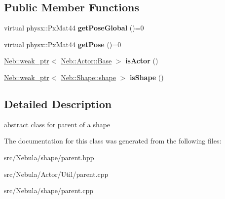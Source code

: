 \subsection*{\-Public \-Member \-Functions}
\begin{DoxyCompactItemize}
\item 
\hypertarget{classNeb_1_1Shape_1_1parent_a983131de9b12b32f30dd418b0779b509}{virtual physx\-::\-Px\-Mat44 {\bfseries get\-Pose\-Global} ()=0}\label{classNeb_1_1Shape_1_1parent_a983131de9b12b32f30dd418b0779b509}

\item 
\hypertarget{classNeb_1_1Shape_1_1parent_a38a4a71ad092ebd7c5b4e76ab20d2a1c}{virtual physx\-::\-Px\-Mat44 {\bfseries get\-Pose} ()=0}\label{classNeb_1_1Shape_1_1parent_a38a4a71ad092ebd7c5b4e76ab20d2a1c}

\item 
\hypertarget{classNeb_1_1Shape_1_1parent_ad8b140d7fd824fbc3248e711f9b748bc}{\hyperlink{classNeb_1_1weak__ptr}{\-Neb\-::weak\-\_\-ptr}$<$ \hyperlink{classNeb_1_1Actor_1_1Base}{\-Neb\-::\-Actor\-::\-Base} $>$ {\bfseries is\-Actor} ()}\label{classNeb_1_1Shape_1_1parent_ad8b140d7fd824fbc3248e711f9b748bc}

\item 
\hypertarget{classNeb_1_1Shape_1_1parent_ab41114661259f3f7dac9b251ea542e56}{\hyperlink{classNeb_1_1weak__ptr}{\-Neb\-::weak\-\_\-ptr}$<$ \hyperlink{classNeb_1_1Shape_1_1shape}{\-Neb\-::\-Shape\-::shape} $>$ {\bfseries is\-Shape} ()}\label{classNeb_1_1Shape_1_1parent_ab41114661259f3f7dac9b251ea542e56}

\end{DoxyCompactItemize}


\subsection{\-Detailed \-Description}
abstract class for parent of a shape 

\-The documentation for this class was generated from the following files\-:\begin{DoxyCompactItemize}
\item 
src/\-Nebula/shape/parent.\-hpp\item 
src/\-Nebula/\-Actor/\-Util/parent.\-cpp\item 
src/\-Nebula/shape/parent.\-cpp\end{DoxyCompactItemize}
